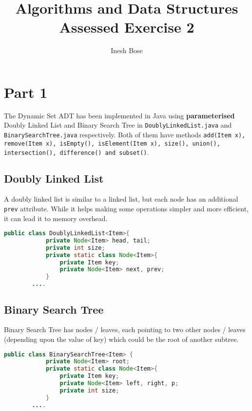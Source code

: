 \documentclass{article}
\title{Algorithms and Data Structures \\ Assessed Exercise 2}
\author{Inesh Bose}
\date{}
\newcommand{\code}[1]{\texttt{#1}}
\begin{document}
\maketitle
\vspace{2cm}
\tableofcontents
{}


\newpage

\section{Part 1}
The Dynamic Set ADT has been implemented in Java using \textbf{parameterised} Doubly Linked List and Binary Search Tree in \code{DoublyLinkedList.java} and \code{BinarySearchTree.java} respectively. Both of them have methods \code{add(Item x), remove(Item x), isEmpty(), isElement(Item x), size(), union(), intersection(), difference() and subset()}. \\

\bigskip

\subsection{Doubly Linked List}
A doubly linked list is similar to a linked list, but each node has an additional \code{prev} attribute. While it helps making some operations simpler and more efficient, it can lead it to memory overhead. \\
\begin{lstlisting}[language=Java]
        public class DoublyLinkedList<Item>{
            private Node<Item> head, tail;
            private int size;
            private static class Node<Item>{
                private Item key;
                private Node<Item> next, prev;
            }
        ....
\end{lstlisting}

\bigskip

\subsection{Binary Search Tree}
Binary Search Tree has nodes / leaves, each pointing to two other nodes / leaves \\(depending upon the value of key) which could be the root of another subtree. \\
\begin{lstlisting}[language=Java]
        public class BinarySearchTree<Item> {
            private Node<Item> root;
            private static class Node<Item>{
                private Item key;
                private Node<Item> left, right, p;
                private int size;
            }
        ....
\end{lstlisting}
\end{document}
